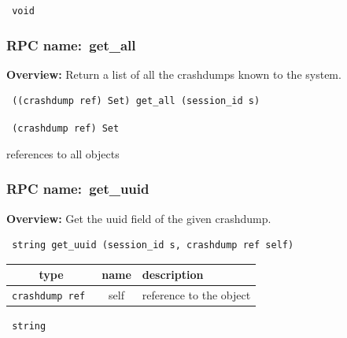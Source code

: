 \vspace{0.3cm}

{\tt 
void
}



\vspace{0.3cm}
\vspace{0.3cm}
\vspace{0.3cm}
\subsubsection{RPC name:~get\_all}

{\bf Overview:} 
Return a list of all the crashdumps known to the system.

\begin{verbatim} ((crashdump ref) Set) get_all (session_id s)\end{verbatim}


\vspace{0.3cm}

{\tt 
(crashdump ref) Set
}


references to all objects
\vspace{0.3cm}
\vspace{0.3cm}
\vspace{0.3cm}
\subsubsection{RPC name:~get\_uuid}

{\bf Overview:} 
Get the uuid field of the given crashdump.

\begin{verbatim} string get_uuid (session_id s, crashdump ref self)\end{verbatim}



 
\vspace{0.3cm}
\begin{tabular}{|c|c|p{7cm}|}
 \hline
{\bf type} & {\bf name} & {\bf description} \\ \hline
{\tt crashdump ref } & self & reference to the object \\ \hline 

\end{tabular}

\vspace{0.3cm}

{\tt 
string
}


